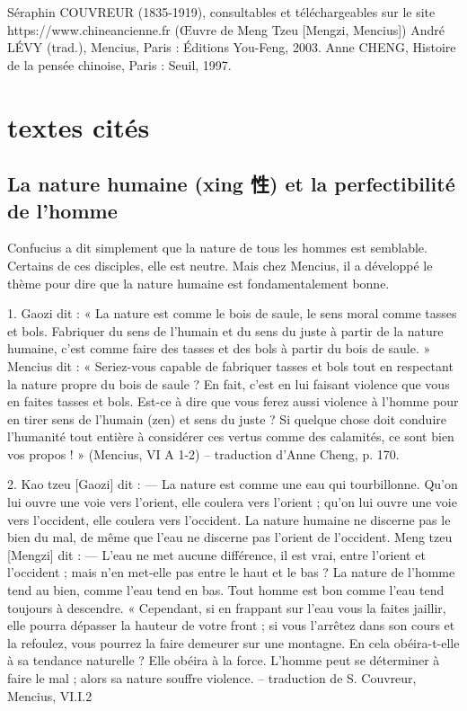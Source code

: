 Séraphin	COUVREUR	(1835-1919),	consultables	et	téléchargeables	sur	le	site https://www.chineancienne.fr (Œuvre de Meng Tzeu [Mengzi, Mencius])
André LÉVY (trad.), Mencius, Paris : Éditions You-Feng, 2003. Anne CHENG, Histoire de la pensée chinoise, Paris : Seuil, 1997.


\section{textes cités}

\subsection{La nature humaine (xing 性) et la perfectibilité de l’homme}

Confucius a dit simplement que la nature de tous les hommes est semblable. Certains de ces disciples, elle est neutre. Mais chez Mencius, il a développé le thème pour dire que la nature humaine est fondamentalement bonne. 


\begin{singlequote}
    1.	Gaozi dit : « La nature est comme le bois de saule, le sens moral comme tasses et bols. Fabriquer du sens de l’humain et du sens du juste à partir de la nature humaine, c’est comme faire des tasses et des bols à partir du bois de saule. »
Mencius dit : « Seriez-vous capable de fabriquer tasses et bols tout en respectant la nature propre du bois de saule ? En fait, c’est en lui faisant violence que vous en faites tasses et bols. Est-ce à dire que vous ferez aussi violence à l’homme pour en tirer sens de l’humain (zen) et sens du juste ? Si quelque chose doit conduire l’humanité tout entière à considérer ces vertus comme des calamités, ce sont bien vos propos ! » (Mencius, VI A 1-2)
-- traduction d’Anne Cheng, p. 170.
\end{singlequote}

\begin{singlequote}
    2.	Kao tzeu [Gaozi] dit :
—	La nature est comme une eau qui tourbillonne. Qu’on lui ouvre une voie vers l’orient, elle coulera vers l’orient ; qu’on lui ouvre une voie vers l’occident, elle coulera vers l’occident. La nature humaine ne discerne pas le bien du mal, de même que l’eau ne discerne pas l’orient de l’occident.
Meng tzeu [Mengzi] dit :
—	L’eau ne met aucune différence, il est vrai, entre l’orient et l’occident ; mais n’en met-elle pas entre le haut et le bas ? La nature de l’homme tend au bien, comme l’eau tend en bas. Tout homme est bon comme l’eau tend toujours à descendre.
« Cependant, si en frappant sur l’eau vous la faites jaillir, elle pourra dépasser la hauteur de votre front ; si vous l’arrêtez dans son cours et la refoulez, vous pourrez la faire demeurer sur une montagne. En cela obéira-t-elle à sa tendance naturelle ? Elle obéira à la force. L’homme peut se déterminer à faire le mal ; alors sa nature souffre violence.
-- traduction de S. Couvreur, Mencius, VI.I.2
\end{singlequote}

